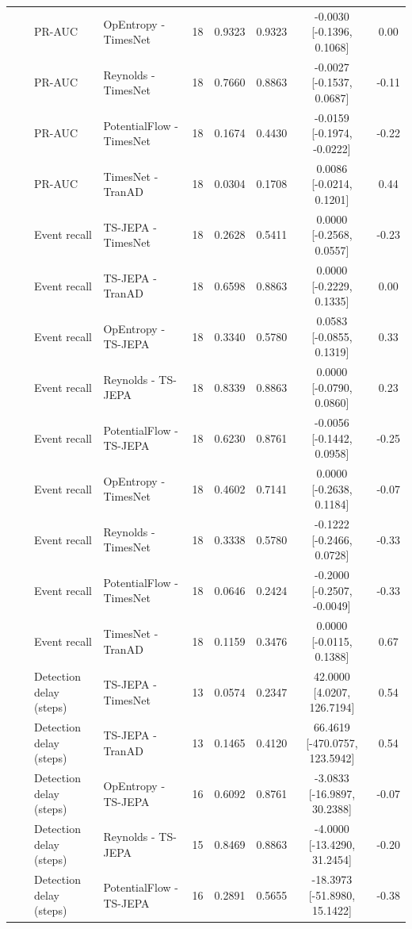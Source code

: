 {\begin{longtable}{@{}llllccccc@{}}
 &  & PR-AUC & OpEntropy - TimesNet & 18 & 0.9323 & 0.9323 & -0.0030 [-0.1396, 0.1068] & 0.00 \\
 &  & PR-AUC & Reynolds - TimesNet & 18 & 0.7660 & 0.8863 & -0.0027 [-0.1537, 0.0687] & -0.11 \\
 &  & PR-AUC & PotentialFlow - TimesNet & 18 & 0.1674 & 0.4430 & -0.0159 [-0.1974, -0.0222] & -0.22 \\
 &  & PR-AUC & TimesNet - TranAD & 18 & 0.0304 & 0.1708 & 0.0086 [-0.0214, 0.1201] & 0.44 \\
 &  & Event recall & TS-JEPA - TimesNet & 18 & 0.2628 & 0.5411 & 0.0000 [-0.2568, 0.0557] & -0.23 \\
 &  & Event recall & TS-JEPA - TranAD & 18 & 0.6598 & 0.8863 & 0.0000 [-0.2229, 0.1335] & 0.00 \\
 &  & Event recall & OpEntropy - TS-JEPA & 18 & 0.3340 & 0.5780 & 0.0583 [-0.0855, 0.1319] & 0.33 \\
 &  & Event recall & Reynolds - TS-JEPA & 18 & 0.8339 & 0.8863 & 0.0000 [-0.0790, 0.0860] & 0.23 \\
 &  & Event recall & PotentialFlow - TS-JEPA & 18 & 0.6230 & 0.8761 & -0.0056 [-0.1442, 0.0958] & -0.25 \\
 &  & Event recall & OpEntropy - TimesNet & 18 & 0.4602 & 0.7141 & 0.0000 [-0.2638, 0.1184] & -0.07 \\
 &  & Event recall & Reynolds - TimesNet & 18 & 0.3338 & 0.5780 & -0.1222 [-0.2466, 0.0728] & -0.33 \\
 &  & Event recall & PotentialFlow - TimesNet & 18 & 0.0646 & 0.2424 & -0.2000 [-0.2507, -0.0049] & -0.33 \\
 &  & Event recall & TimesNet - TranAD & 18 & 0.1159 & 0.3476 & 0.0000 [-0.0115, 0.1388] & 0.67 \\
 &  & Detection delay (steps) & TS-JEPA - TimesNet & 13 & 0.0574 & 0.2347 & 42.0000 [4.0207, 126.7194] & 0.54 \\
 &  & Detection delay (steps) & TS-JEPA - TranAD & 13 & 0.1465 & 0.4120 & 66.4619 [-470.0757, 123.5942] & 0.54 \\
 &  & Detection delay (steps) & OpEntropy - TS-JEPA & 16 & 0.6092 & 0.8761 & -3.0833 [-16.9897, 30.2388] & -0.07 \\
 &  & Detection delay (steps) & Reynolds - TS-JEPA & 15 & 0.8469 & 0.8863 & -4.0000 [-13.4290, 31.2454] & -0.20 \\
 &  & Detection delay (steps) & PotentialFlow - TS-JEPA & 16 & 0.2891 & 0.5655 & -18.3973 [-51.8980, 15.1422] & -0.38 \\

\end{longtable}}
